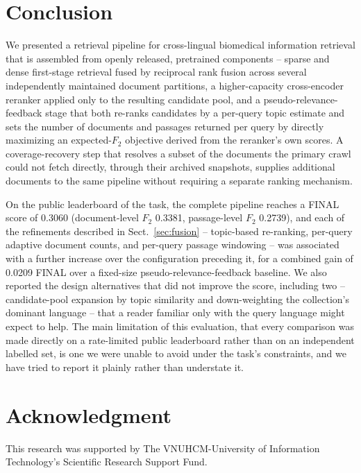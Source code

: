 \documentclass[runningheads]{llncs}
\begin{document}
\section{Conclusion}

We presented a retrieval pipeline for cross-lingual biomedical information
retrieval that is assembled from openly released, pretrained components --
sparse and dense first-stage retrieval fused by reciprocal rank fusion across
several independently maintained document partitions, a higher-capacity
cross-encoder reranker applied only to the resulting candidate pool, and a
pseudo-relevance-feedback stage that both re-ranks candidates by a per-query
topic estimate and sets the number of documents and passages returned per
query by directly maximizing an expected-$F_2$ objective derived from the
reranker's own scores. A coverage-recovery step that resolves a subset of
the documents the primary crawl could not fetch directly, through their
archived snapshots, supplies additional documents to the same pipeline
without requiring a separate ranking mechanism.

On the public leaderboard of the task, the complete pipeline reaches a FINAL
score of 0.3060 (document-level $F_2$ 0.3381, passage-level $F_2$ 0.2739),
and each of the refinements described in Sect.~\ref{sec:fusion} --
topic-based re-ranking, per-query adaptive document counts, and per-query
passage windowing -- was associated with a further increase over the
configuration preceding it, for a combined gain of 0.0209 FINAL over a
fixed-size pseudo-relevance-feedback baseline. We also reported the design
alternatives that did not improve the score, including two -- candidate-pool
expansion by topic similarity and down-weighting the collection's dominant
language -- that a reader familiar only with the query language might expect
to help. The main limitation of this evaluation, that every comparison was
made directly on a rate-limited public leaderboard rather than on an
independent labelled set, is one we were unable to avoid under the task's
constraints, and we have tried to report it plainly rather than understate
it.

\section*{Acknowledgment}
This research was supported by The VNUHCM-University of Information Technology's Scientific Research Support Fund.



\end{document}
